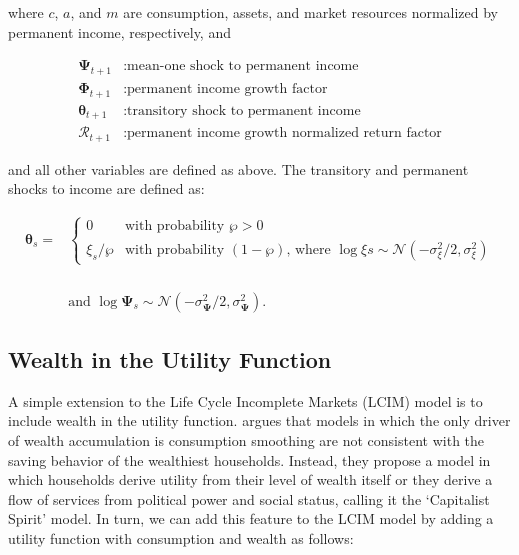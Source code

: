 \documentclass{article}
\newcommand{\PermGroFac}{\pmb{\Phi}}
\newcommand{\PermShk}{\mathbf{\Psi}}
\newcommand{\aNrm}{a}
\newcommand{\cNrm}{c}
\newcommand{\RNrm}{\mathcal{R}}
\newcommand{\TranShkEmp}{\pmb{\theta}}
\newcommand{\mNrm}{m}
\newcommand{\pZero}{\wp}
\newcommand{\thicksim}{\sim}
\begin{document}
where $\cNrm$, $\aNrm$, and $\mNrm$ are consumption, assets, and market resources normalized by permanent income, respectively, and

\begin{equation}
\begin{align}
  \PermShk_{t+1} & :  \text{mean-one shock to permanent income}
    \\ \PermGroFac_{t+1} & :  \text{permanent income growth factor}
    \\ \TranShkEmp_{t+1} & :  \text{transitory shock to permanent income}
    \\ \RNrm_{t+1} & :  \text{permanent income growth normalized return factor}
\end{align}
\end{equation}

and all other variables are defined as above. The transitory and permanent shocks to income are defined as:

\begin{equation}
\begin{align}
\TranShkEmp_{s}  = &
    \begin{cases}
        0\phantom{/\pZero} & \text{with probability $\pZero>0$}
        \\ \xi_{s}/\pZero & \text{with probability $(1-\pZero)$, where
            $\log \xi{s}\thicksim \mathcal{N}(-\sigma_{\xi}^{2}/2,\sigma_{\xi}^{2})$}
    \end{cases}
    \\ \phantom{/\pZero} \\ & \text{and }  \log \PermShk_{s}   \thicksim \mathcal{N}(-\sigma_{\PermShk}^{2}/2,\sigma_{\PermShk}^{2}).
  \end{align}
\end{equation}

\subsection{Wealth in the Utility Function}\label{Wealth in the Utility Function}

A simple extension to the Life Cycle Incomplete Markets (LCIM) model is to include wealth in the utility function. \cite{Carroll_1998} argues that models in which the only driver of wealth accumulation is consumption smoothing are not consistent with the saving behavior of the wealthiest households. Instead, they propose a model in which households derive utility from their level of wealth itself or they derive a flow of services from political power and social status, calling it the `Capitalist Spirit' model. In turn, we can add this feature to the LCIM model by adding a utility function with consumption and wealth as follows:
\end{document}
